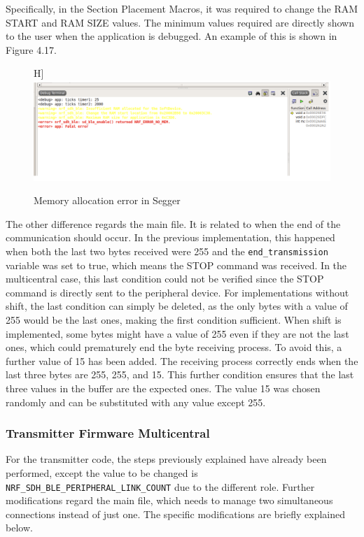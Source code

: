\documentclass{Configuration_Files/PoliMi3i_thesis}
\begin{document}
Specifically, in the Section Placement Macros, it was required to change the RAM START and RAM SIZE values. The minimum values required are directly shown to the user when the application is debugged. An example of this is shown in Figure 4.17.

\begin{figure}H]
    \centering
    \includegraphics[scale=0.6]{Multicentral/4.png}
    \caption{Memory allocation error in Segger}
    \label{multicentral_4}
\end{figure}

The other difference regards the main file. It is related to when the end of the communication should occur. In the previous implementation, this happened when both the last two bytes received were 255 and the \texttt{end\_transmission} variable was set to true, which means the STOP command was received. In the multicentral case, this last condition could not be verified since the STOP command is directly sent to the peripheral device. For implementations without shift, the last condition can simply be deleted, as the only bytes with a value of 255 would be the last ones, making the first condition sufficient. When shift is implemented, some bytes might have a value of 255 even if they are not the last ones, which could prematurely end the byte receiving process. To avoid this, a further value of 15 has been added. The receiving process correctly ends when the last three bytes are 255, 255, and 15. This further condition ensures that the last three values in the buffer are the expected ones. The value 15 was chosen randomly and can be substituted with any value except 255.

\subsubsection{Transmitter Firmware Multicentral}
For the transmitter code, the steps previously explained have already been performed, except the value to be changed is \texttt{NRF\_SDH\_BLE\_PERIPHERAL\_LINK\_COUNT} due to the different role. Further modifications regard the main file, which needs to manage two simultaneous connections instead of just one. The specific modifications are briefly explained below.
\end{document}
